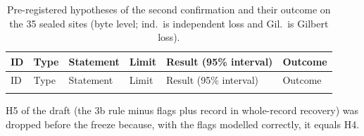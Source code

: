 {\footnotesize
\begin{longtable}{@{}>{\raggedright\arraybackslash}p{0.55cm}>{\raggedright\arraybackslash}p{1.3cm}>{\raggedright\arraybackslash}p{2.4cm}>{\raggedright\arraybackslash}p{1.8cm}>{\raggedright\arraybackslash}p{3.8cm}>{\raggedright\arraybackslash}p{1.3cm}@{}}
\caption{Pre-registered hypotheses of the second confirmation and their outcome on the 35 sealed sites (byte level; ind.\ is independent loss and Gil.\ is Gilbert loss).}\label{tab:hyp}\\
\toprule
ID & Type & Statement & Limit & Result (95\% interval) & Outcome \\
\midrule
\endfirsthead
\toprule
ID & Type & Statement & Limit & Result (95\% interval) & Outcome \\
\midrule
\endhead
\bottomrule
\endfoot

\end{longtable}
}

H5 of the draft (the 3b rule minus flags plus record in whole-record recovery) was dropped before the freeze because, with the flags modelled correctly, it equals H4.
